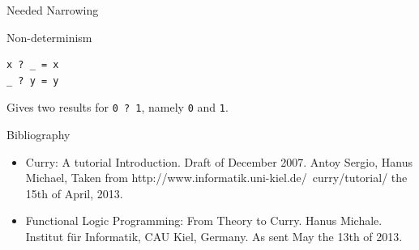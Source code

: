 \documentclass{beamer}
\begin{document}
\begin{section}{Needed Narrowing}
\begin{subsection}{Non-determinism}
\begin{frame}[fragile]
\begin{verbatim}
x ? _ = x
_ ? y = y
\end{verbatim}

  Gives two results for \verb|0 ? 1|, namely \verb|0| and \verb|1|.
  
\end{frame}

\end{subsection}
\end{section}
\begin{section}{Bibliography}
  \begin{frame}
  \begin{itemize}
  \item Curry: A tutorial Introduction. Draft of December 2007. Antoy Sergio, Hanus Michael, Taken from http://www.informatik.uni-kiel.de/~curry/tutorial/ the 15th of April, 2013.


    \item Functional Logic Programming: From Theory to Curry. Hanus Michale. Institut f\"ur Informatik, CAU Kiel, Germany. As sent May the 13th of 2013.
  \end{itemize}

\end{frame}
\end{section}
\end{document}
